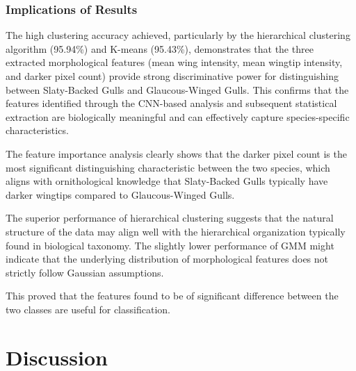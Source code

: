 \documentclass[a4paper,12pt]{report}
\begin{document}


\subsection{Implications of Results}

The high clustering accuracy achieved, particularly by the hierarchical clustering algorithm (95.94\%) and K-means (95.43\%), demonstrates that the three extracted morphological features (mean wing intensity, mean wingtip intensity, and darker pixel count) provide strong discriminative power for distinguishing between Slaty-Backed Gulls and Glaucous-Winged Gulls. This confirms that the features identified through the CNN-based analysis and subsequent statistical extraction are biologically meaningful and can effectively capture species-specific characteristics.

The feature importance analysis clearly shows that the darker pixel count is the most significant distinguishing characteristic between the two species, which aligns with ornithological knowledge that Slaty-Backed Gulls typically have darker wingtips compared to Glaucous-Winged Gulls.

The superior performance of hierarchical clustering suggests that the natural structure of the data may align well with the hierarchical organization typically found in biological taxonomy. The slightly lower performance of GMM might indicate that the underlying distribution of morphological features does not strictly follow Gaussian assumptions.

This proved that the features found to be of significant difference between the two classes are useful for classification.

\chapter{Discussion}
\end{document}
